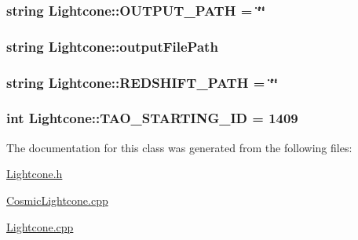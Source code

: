 \subsubsection[{O\+U\+T\+P\+U\+T\+\_\+\+P\+A\+T\+H}]{\setlength{\rightskip}{0pt plus 5cm}string Lightcone\+::\+O\+U\+T\+P\+U\+T\+\_\+\+P\+A\+T\+H = \char`\"{}\char`\"{}\hspace{0.3cm}{\ttfamily [static]}}\label{classLightcone_ad96b184f7878ceb27ed89aa6ee7fda0b}
\hypertarget{classLightcone_a4abb9ce077488d3744e00b1ad4969299}{}
\subsubsection[{output\+File\+Path}]{\setlength{\rightskip}{0pt plus 5cm}string Lightcone\+::output\+File\+Path}\label{classLightcone_a4abb9ce077488d3744e00b1ad4969299}
\hypertarget{classLightcone_a5e3e2f76c9a6230556cf82e170221d1f}{}
\subsubsection[{R\+E\+D\+S\+H\+I\+F\+T\+\_\+\+P\+A\+T\+H}]{\setlength{\rightskip}{0pt plus 5cm}string Lightcone\+::\+R\+E\+D\+S\+H\+I\+F\+T\+\_\+\+P\+A\+T\+H = \char`\"{}\char`\"{}\hspace{0.3cm}{\ttfamily [static]}}\label{classLightcone_a5e3e2f76c9a6230556cf82e170221d1f}
\hypertarget{classLightcone_a82c274cc5d7d3db62e9e4b64a1fc11da}{}
\subsubsection[{T\+A\+O\+\_\+\+S\+T\+A\+R\+T\+I\+N\+G\+\_\+\+I\+D}]{\setlength{\rightskip}{0pt plus 5cm}int Lightcone\+::\+T\+A\+O\+\_\+\+S\+T\+A\+R\+T\+I\+N\+G\+\_\+\+I\+D = 1409\hspace{0.3cm}{\ttfamily [static]}}\label{classLightcone_a82c274cc5d7d3db62e9e4b64a1fc11da}


The documentation for this class was generated from the following files\+:\begin{DoxyCompactItemize}
\item 
\hyperlink{Lightcone_8h}{Lightcone.\+h}\item 
\hyperlink{CosmicLightcone_8cpp}{Cosmic\+Lightcone.\+cpp}\item 
\hyperlink{Lightcone_8cpp}{Lightcone.\+cpp}\end{DoxyCompactItemize}
